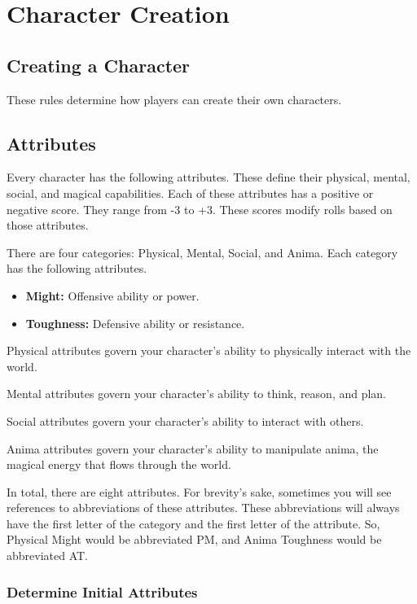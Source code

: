 \chapter{Character Creation}

\begin{multicols}{2}

\section{Creating a Character}

These rules determine how players can create their own characters.

\section{Attributes}

Every character has the following attributes. These define their
physical, mental, social, and magical capabilities. Each of these
attributes has a positive or negative score. They range from -3 to +3.
These scores modify rolls based on those attributes.

There are four categories: Physical, Mental, Social, and Anima.
Each category has the following attributes.

\begin{itemize}
  \item \textbf{Might:} Offensive ability or power.
  \item \textbf{Toughness:} Defensive ability or resistance.
\end{itemize}

Physical attributes govern your character's ability to physically
interact with the world.

Mental attributes govern your character's ability to think, reason,
and plan.

Social attributes govern your character's ability to interact with
others.

Anima attributes govern your character's ability to manipulate
anima, the magical energy that flows through the world.

In total, there are eight attributes. For brevity's sake, sometimes
you will see references to abbreviations of these attributes. These
abbreviations will always have the first letter of the category and
the first letter of the attribute. So, Physical Might would be
abbreviated PM, and Anima Toughness would be abbreviated AT.

\subsection{Determine Initial Attributes}


\end{multicols}
